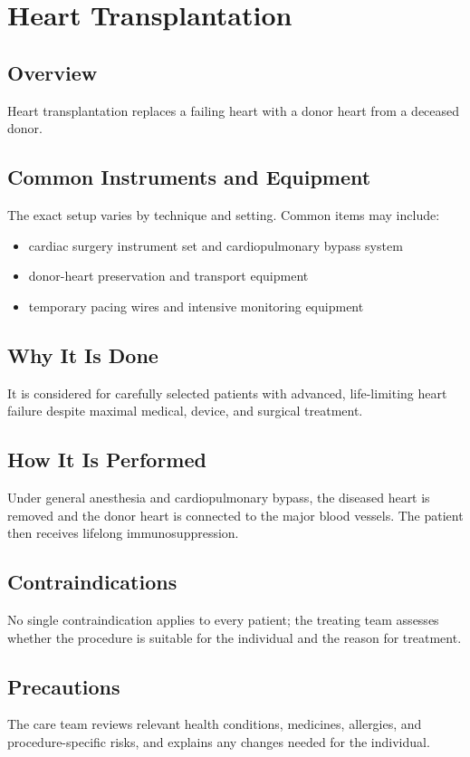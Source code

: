 \chapter{Heart Transplantation}

\section*{Overview}
Heart transplantation replaces a failing heart with a donor heart from a deceased donor.

\section*{Common Instruments and Equipment}
The exact setup varies by technique and setting. Common items may include:
\begin{itemize}[nosep,leftmargin=*]
  \item cardiac surgery instrument set and cardiopulmonary bypass system
  \item donor-heart preservation and transport equipment
  \item temporary pacing wires and intensive monitoring equipment
\end{itemize}

\section*{Why It Is Done}
It is considered for carefully selected patients with advanced, life-limiting heart failure despite maximal medical, device, and surgical treatment.

\section*{How It Is Performed}
Under general anesthesia and cardiopulmonary bypass, the diseased heart is removed and the donor heart is connected to the major blood vessels. The patient then receives lifelong immunosuppression.

\section*{Contraindications}
No single contraindication applies to every patient; the treating team assesses whether the procedure is suitable for the individual and the reason for treatment.

\section*{Precautions}
The care team reviews relevant health conditions, medicines, allergies, and procedure-specific risks, and explains any changes needed for the individual.

